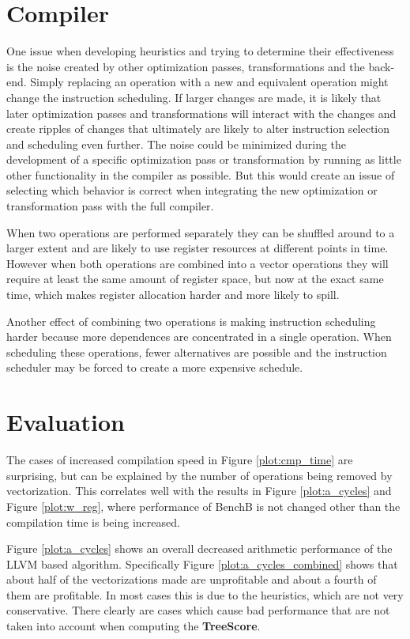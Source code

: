 \documentclass[12pt,a4paper,onecolumn,twoside,openright]{report}
\begin{document}
\section{Compiler}
\label{sec:compiler}
One issue when developing heuristics and trying to determine their effectiveness is the noise created by other optimization passes, transformations and the back-end. Simply replacing an operation with a new and equivalent operation might change the instruction scheduling. If larger changes are made, it is likely that later optimization passes and transformations will interact with the changes and create ripples of changes that ultimately are likely to alter instruction selection and scheduling even further. The noise could be minimized during the development of a specific optimization pass or transformation by running as little other functionality in the compiler as possible. But this would create an issue of selecting which behavior is correct when integrating the new optimization or transformation pass with the full compiler.


When two operations are performed separately they can be shuffled around to a larger extent and are likely to use register resources at different points in time. However when both operations are combined into a vector operations they will require at least the same amount of register space, but now at the exact same time, which makes register allocation harder and more likely to spill.


Another effect of combining two operations is making instruction scheduling harder because more dependences are concentrated in a single operation. When scheduling these operations, fewer alternatives are possible and the instruction scheduler may be forced to create a more expensive schedule. 



\section{Evaluation}
The cases of increased compilation speed in Figure \ref{plot:cmp_time} are surprising, but can be explained by the number of operations being removed by vectorization. This correlates well with the results in Figure \ref{plot:a_cycles} and Figure \ref{plot:w_reg}, where performance of BenchB is not changed other than the compilation time is being increased.

Figure \ref{plot:a_cycles} shows an overall decreased arithmetic performance of the LLVM based algorithm. Specifically Figure \ref{plot:a_cycles_combined} shows that about half of the vectorizations made are unprofitable and about a fourth of them are profitable. In most cases this is due to the heuristics, which are not very conservative. There clearly are cases which cause bad performance that are not taken into account when computing the \textbf{TreeScore}.
\end{document}
